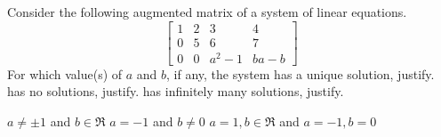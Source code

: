 
\begin{Exercise}[name={},
title={}, 
origin={\cite{YL}},
counter=Exercise]
Consider the following augmented matrix of a system of linear equations.
\[
\begin{bmatrix}
1 & 2 & 3 & 4\\
0 & 5 & 6 & 7\\
0 & 0 & a^2-1 & ba-b
\end{bmatrix}
\]
For which value(s) of $a$ and $b$, if any, the system
\Question has a unique solution, justify.
\Question has no solutions, justify.
\Question has infinitely many solutions, justify.
\end{Exercise}

\begin{Answer}
\Question $a\neq\pm 1$ and $b\in\Re$
\Question $a=-1$ and $b\neq 0$
\Question $a=1, b\in\Re$ and $a=-1, b=0$
\end{Answer}


